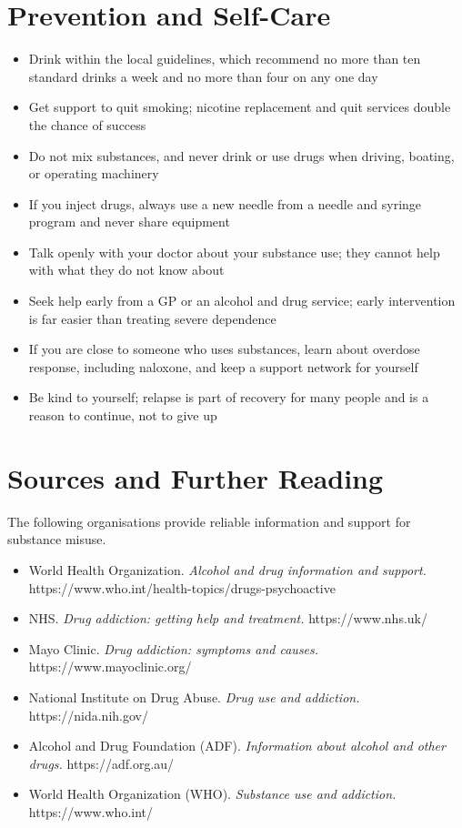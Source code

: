 \section*{Prevention and Self-Care}
\begin{itemize}
    \item Drink within the local guidelines, which recommend no more than ten standard drinks a week and no more than four on any one day
    \item Get support to quit smoking; nicotine replacement and quit services double the chance of success
    \item Do not mix substances, and never drink or use drugs when driving, boating, or operating machinery
    \item If you inject drugs, always use a new needle from a needle and syringe program and never share equipment
    \item Talk openly with your doctor about your substance use; they cannot help with what they do not know about
    \item Seek help early from a GP or an alcohol and drug service; early intervention is far easier than treating severe dependence
    \item If you are close to someone who uses substances, learn about overdose response, including naloxone, and keep a support network for yourself
    \item Be kind to yourself; relapse is part of recovery for many people and is a reason to continue, not to give up
\end{itemize}

\section*{Sources and Further Reading}
The following organisations provide reliable information and support for substance misuse.

\begin{itemize}
    \item World Health Organization. \textit{Alcohol and drug information and support.} https://www.who.int/health-topics/drugs-psychoactive
    \item NHS. \textit{Drug addiction: getting help and treatment.} https://www.nhs.uk/
    \item Mayo Clinic. \textit{Drug addiction: symptoms and causes.} https://www.mayoclinic.org/
    \item National Institute on Drug Abuse. \textit{Drug use and addiction.} https://nida.nih.gov/
    \item Alcohol and Drug Foundation (ADF). \textit{Information about alcohol and other drugs.} https://adf.org.au/
    \item World Health Organization (WHO). \textit{Substance use and addiction.} https://www.who.int/
\end{itemize}

\clearpage
